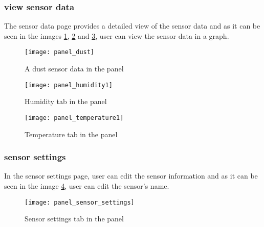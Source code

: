     \subsubsection{view sensor data}
    The sensor data page provides a detailed view of the sensor data and as it can be seen in the images \ref{panel_dust}, \ref{panel_humidity1} and \ref{panel_temperature1}, user can view the sensor data in a graph.
    \begin{figure}
        \centering
        \texttt{[image: panel\_dust]}
        \caption{A dust sensor data in the panel}
        \label{panel_dust}
    \end{figure}
    \begin{figure}
        \centering
        \texttt{[image: panel\_humidity1]}
        \caption{Humidity tab in the panel}
        \label{panel_humidity1}
    \end{figure}
    \begin{figure}
        \centering
        \texttt{[image: panel\_temperature1]}
        \caption{Temperature tab in the panel}
        \label{panel_temperature1}
    \end{figure}
    \subsubsection{sensor settings}
    In the sensor settings page, user can edit the sensor information and as it can be seen in the image \ref{panel_sensor_settings}, user can edit the sensor's name.
    \begin{figure}
        \centering
        \texttt{[image: panel\_sensor\_settings]}
        \caption{Sensor settings tab in the panel}
        \label{panel_sensor_settings}
    \end{figure}
